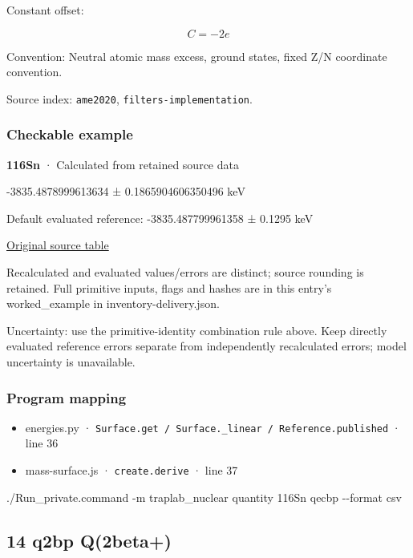 \documentclass[
  11pt,
  letterpaper,
]{article}
\newenvironment{Shaded}{}{}
\newcommand{\AttributeTok}[1]{\textcolor[rgb]{0.49,0.56,0.16}{#1}}
\newcommand{\ExtensionTok}[1]{#1}
\newcommand{\NormalTok}[1]{#1}
\providecommand{\tightlist}{%
  \setlength{\itemsep}{0pt}\setlength{\parskip}{0pt}}
\begin{document}
Constant offset:

\[
C=-2e
\]

Convention: Neutral atomic mass excess, ground states, fixed Z/N
coordinate convention.

Source index: \texttt{ame2020}, \texttt{filters-implementation}.

\subsubsection{Checkable example}\label{checkable-example-12}

\textbf{116Sn} · Calculated from retained source data

-3835.4878999613634 ± 0.1865904606350496 keV

Default evaluated reference: -3835.487799961358 ± 0.1295 keV

\href{https://www-nds.iaea.org/amdc/ame2020/rct1.mas20.txt}{Original
source table}

Recalculated and evaluated values/errors are distinct; source rounding
is retained. Full primitive inputs, flags and hashes are in this entry's
worked\_example in inventory-delivery.json.

Uncertainty: use the primitive-identity combination rule above. Keep
directly evaluated reference errors separate from independently
recalculated errors; model uncertainty is unavailable.

\subsubsection{Program mapping}\label{program-mapping-12}

\begin{itemize}
\tightlist
\item
  energies.py ·
  \texttt{Surface.get\ /\ Surface.\_linear\ /\ Reference.published} ·
  line 36
\item
  mass-surface.js · \texttt{create.derive} · line 37
\end{itemize}

\begin{Shaded}
\begin{Highlighting}[]
\ExtensionTok{./Run\_private.command} \AttributeTok{{-}m}\NormalTok{ traplab\_nuclear quantity 116Sn qecbp }\AttributeTok{{-}{-}format}\NormalTok{ csv}
\end{Highlighting}
\end{Shaded}

\subsection{14 q2bp Q(2beta+)}\label{q2bp-q2beta}
\end{document}
